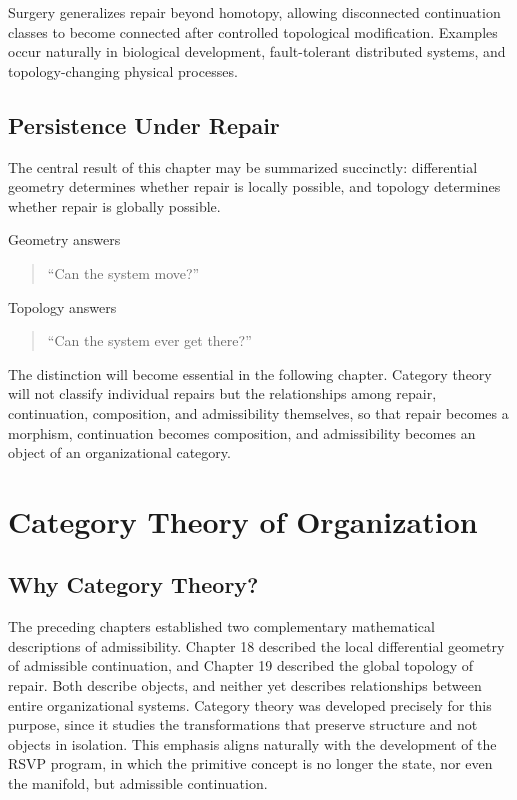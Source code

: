 \documentclass[11pt,oneside]{book}
\numberwithin{equation}{chapter}
\theoremstyle{definition}
\theoremstyle{plain}
\begin{document}
Surgery generalizes repair beyond homotopy, allowing disconnected continuation classes to become connected after controlled topological modification. Examples occur naturally in biological development, fault-tolerant distributed systems, and topology-changing physical processes.

\section{Persistence Under Repair}

The central result of this chapter may be summarized succinctly: differential geometry determines whether repair is locally possible, and topology determines whether repair is globally possible.

Geometry answers

\begin{quote}
``Can the system move?''

\end{quote}

Topology answers

\begin{quote}
``Can the system ever get there?''

\end{quote}

The distinction will become essential in the following chapter. Category theory will not classify individual repairs but the relationships among repair, continuation, composition, and admissibility themselves, so that repair becomes a morphism, continuation becomes composition, and admissibility becomes an object of an organizational category.

\chapter{Category Theory of Organization}

\section{Why Category Theory?}

The preceding chapters established two complementary mathematical descriptions of admissibility. Chapter 18 described the local differential geometry of admissible continuation, and Chapter 19 described the global topology of repair. Both describe objects, and neither yet describes relationships between entire organizational systems. Category theory was developed precisely for this purpose, since it studies the transformations that preserve structure and not objects in isolation. This emphasis aligns naturally with the development of the RSVP program, in which the primitive concept is no longer the state, nor even the manifold, but admissible continuation.
\end{document}
